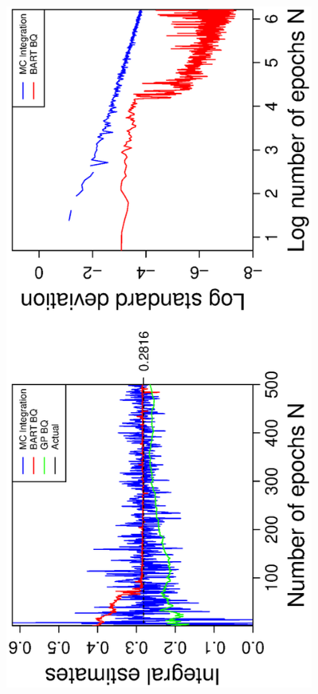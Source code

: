 \vspace{-0.5cm}
\begin{figure}[H]
  \centering
  \hspace{-1.6cm}
  \begin{minipage}[b]{0.4\textwidth}
    \includegraphics[width = 0.9\textwidth, angle = -90]{report/Figures/3/convergenceMean320Dimensions.eps}

\end{minipage}
\end{figure}
